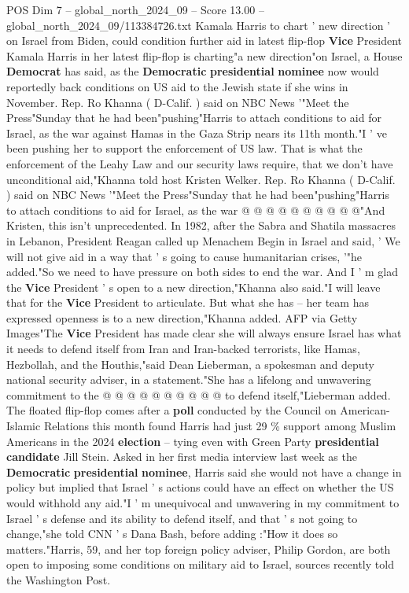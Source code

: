 \begin{textsample}{POS Dim 7 – global\_north\_2024\_09 – Score 13.00 – global\_north\_2024\_09/113384726.txt}  \label{ex:f7_pos_074}
Kamala Harris to chart ' new direction ' on Israel from Biden, could condition further aid in latest flip-flop \textbf{Vice} President Kamala Harris in her latest flip-flop is charting"a new direction"on Israel, a House \textbf{Democrat} has said, as the \textbf{Democratic} \textbf{presidential} \textbf{nominee} now would reportedly back conditions on US aid to the Jewish state if she wins in November.
Rep.
Ro Khanna ( D-Calif. ) said on NBC News '"Meet the Press"Sunday that he had been"pushing"Harris to attach conditions to aid for Israel, as the war against Hamas in the Gaza Strip nears its 11th month."I ' ve been pushing her to support the enforcement of US law.
That is what the enforcement of the Leahy Law and our security laws require, that we don't have unconditional aid,"Khanna told host Kristen Welker.
Rep.
Ro Khanna ( D-Calif. ) said on NBC News '"Meet the Press"Sunday that he had been"pushing"Harris to attach conditions to aid for Israel, as the war @ @ @ @ @ @ @ @ @ @"And Kristen, this isn't unprecedented.
In 1982, after the Sabra and Shatila massacres in Lebanon, President Reagan called up Menachem Begin in Israel and said, ' We will not give aid in a way that ' s going to cause humanitarian crises, '"he added."So we need to have pressure on both sides to end the war.
And I ' m glad the \textbf{Vice} President ' s open to a new direction,"Khanna also said."I will leave that for the \textbf{Vice} President to articulate.
But what she has -- her team has expressed openness is to a new direction,"Khanna added.
AFP via Getty Images"The \textbf{Vice} President has made clear she will always ensure Israel has what it needs to defend itself from Iran and Iran-backed terrorists, like Hamas, Hezbollah, and the Houthis,"said Dean Lieberman, a spokesman and deputy national security adviser, in a statement."She has a lifelong and unwavering commitment to the @ @ @ @ @ @ @ @ @ @ to defend itself,"Lieberman added.
The floated flip-flop comes after a \textbf{poll} conducted by the Council on American-Islamic Relations this month found Harris had just 29 \% support among Muslim Americans in the 2024 \textbf{election} -- tying even with Green Party \textbf{presidential} \textbf{candidate} Jill Stein.
Asked in her first media interview last week as the \textbf{Democratic} \textbf{presidential} \textbf{nominee}, Harris said she would not have a change in policy but implied that Israel ' s actions could have an effect on whether the US would withhold any aid."I ' m unequivocal and unwavering in my commitment to Israel ' s defense and its ability to defend itself, and that ' s not going to change,"she told CNN ' s Dana Bash, before adding :"How it does so matters."Harris, 59, and her top foreign policy adviser, Philip Gordon, are both open to imposing some conditions on military aid to Israel, sources recently told the Washington Post.

\end{textsample}
